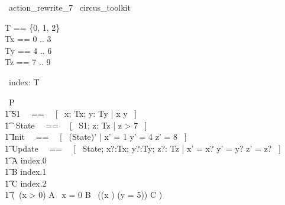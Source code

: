 % 
\begin{zsection}
  \SECTION\ action\_rewrite\_7 \parents\ circus\_toolkit
\end{zsection}

\begin{zed}
    T == \{0, 1, 2\} \\
	Tx == 0 .. 3 \\ 
	Ty == 4 .. 6 \\ 
	Tz == 7 .. 9 \\ 
\end{zed}

\begin{circus}
	\circchannel\ index: T \\
\end{circus}

\begin{circus}
    \circprocess\ P \circdef \circbegin \\
        \t1 S1 ~~==~~ [~  x: Tx; y: Ty | x  \land y  ~] \\
        \t1 \circstate\ State ~~==~~ [~ S1; z: Tz | z > 7 ~] \\
        \t1 Init ~~==~~ [~ (State)' | x' = 1 \land y' = 4 \land z' = 8 ~] \\
        \t1 Update ~~==~~ [~ \Delta State; x?:Tx; y?:Ty; z?: Tz | x' = x? \land y' = y? \land z' = z? ~] \\
        \t1 A \circdef index.0 \then \Skip \\
        \t1 B \circdef index.1 \then \Skip \\
        \t1 C \circdef index.2 \then \Skip \\
        \t1 \circspot (\circif\ (x > 0) \circthen A 
                       \circelse\ x = 0 \circthen B 
                       \circelse\ ((x ) \land (y = 5)) \circthen C 
                       \circfi) \\
	\circend
\end{circus}

